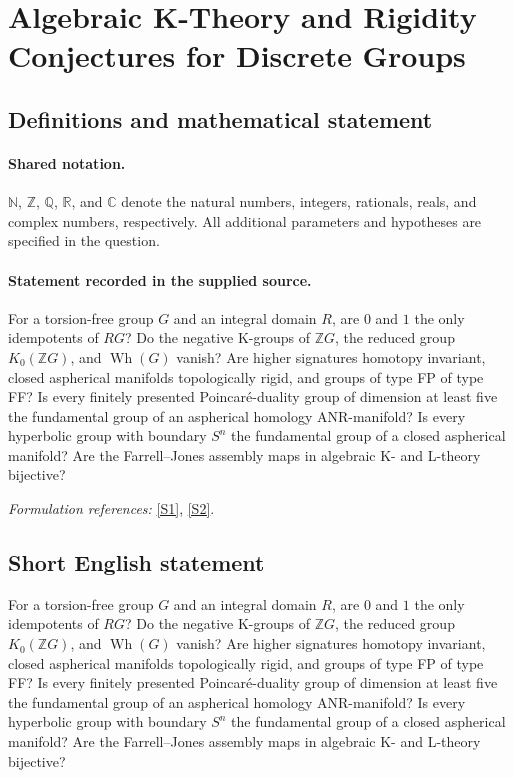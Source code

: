 \documentclass[11pt]{article}
\newcommand{\sref}[2]{\hyperlink{source:#1:#2}{[S#2]}}
\begin{document}
\section{Algebraic K-Theory and Rigidity Conjectures for Discrete Groups}\label{statement}

\subsection{Definitions and mathematical statement}

\paragraph{Shared notation.}$\mathbb N$, $\mathbb Z$, $\mathbb Q$, $\mathbb R$, and $\mathbb C$ denote the natural numbers, integers, rationals, reals, and complex numbers, respectively. All additional parameters and hypotheses are specified in the question.


\paragraph{Statement recorded in the supplied source.}
For a torsion-free group $G$ and an integral domain $R$, are $0$ and $1$ the only idempotents of $RG$? Do the negative K-groups of $\mathbb{Z}G$, the reduced group $K_0(\mathbb{Z}G)$, and $\operatorname{Wh}(G)$ vanish? Are higher signatures homotopy invariant, closed aspherical manifolds topologically rigid, and groups of type FP of type FF? Is every finitely presented Poincaré-duality group of dimension at least five the fundamental group of an aspherical homology ANR-manifold? Is every hyperbolic group with boundary $S^n$ the fundamental group of a closed aspherical manifold? Are the Farrell–Jones assembly maps in algebraic K- and L-theory bijective?
\par\smallskip\textit{Formulation references:} \sref{statement}{1}, \sref{statement}{2}.
\subsection{Short English statement}
For a torsion-free group $G$ and an integral domain $R$, are $0$ and $1$ the only idempotents of $RG$? Do the negative K-groups of $\mathbb{Z}G$, the reduced group $K_0(\mathbb{Z}G)$, and $\operatorname{Wh}(G)$ vanish? Are higher signatures homotopy invariant, closed aspherical manifolds topologically rigid, and groups of type FP of type FF? Is every finitely presented Poincaré-duality group of dimension at least five the fundamental group of an aspherical homology ANR-manifold? Is every hyperbolic group with boundary $S^n$ the fundamental group of a closed aspherical manifold? Are the Farrell–Jones assembly maps in algebraic K- and L-theory bijective?
\end{document}
